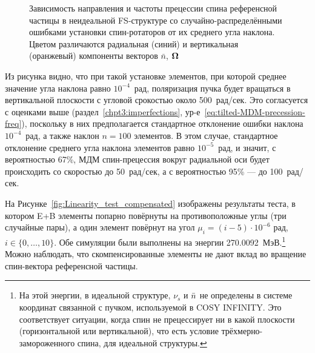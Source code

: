 \begin{figure}[H]\centering
	\caption{Зависимость направления и частоты прецессии спина референсной частицы в неидеальной FS-структуре со случайно-распределёнными ошибками установки спин-ротаторов от их среднего угла наклона.\label{fig:Linearity_test_shifting_gauss}
	Цветом различаются радиальная (синий) и вертикальная (оранжевый) компоненты векторов $\bar n$, $\boldsymbol{\Omega}$}
\end{figure}

Из рисунка видно, что при такой установке элементов, при которой среднее значение угла наклона равно 
$10^{-4}$~рад, поляризация пучка будет вращаться в вертикальной плоскости с угловой срокостью 
около 500~рад/сек. Это согласуется с оценками выше (раздел~\ref{chpt3:imperfections},
 ур-е~\eqref{eq:tilted-MDM-precession-freq}), поскольку в них предполагается 
 стандартное отклонение ошибки наклона $10^{-4}$~рад, а также наклон ${n=100}$ элементов. 
 В этом случае, стандартное отклонение среднего угла наклона элементов равно $10^{-5}$~рад, и значит, 
 с вероятностью 67\%, МДМ спин-прецессия вокруг радиальной оси будет происходить со скоростью 
 до 50~рад/сек, а с вероятностью 95\% --- до 100~рад/сек.

На Рисунке~\ref{fig:Linearity_test_compensated} изображены результаты теста, в котором 
E+B элементы попарно повёрнуты на противоположные углы (три случайные пары), а один элемент 
повёрнут на угол ${\mu_i = (i-5)\cdot 10^{-6}}$ рад, ${i\in\lbrace0,\dots,10\rbrace}$. Обе симуляции были 
выполнены на энергии 270.0092~МэВ.\footnote{На этой энергии, в идеальной структуре, 
	$\nu_s$ и $\bar n$ не определены в системе координат связанной с пучком, используемой в
	COSY INFINITY. Это соответствует ситуации, когда спин не прецессирует ни в какой плоскости 
	(горизонтальной или вертикальной), что есть условие трёхмерно-замороженного спина, 
	для идеальной структуры.} Можно наблюдать, что скомпенсированные элементы не дают вклад во вращение
спин-вектора референсной частицы.

